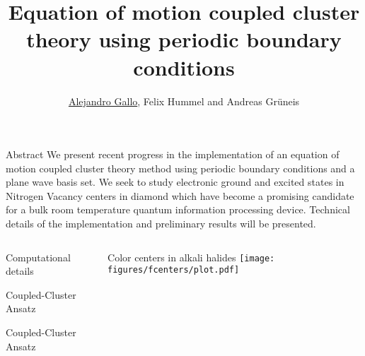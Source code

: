 \documentclass[final]{beamer}
\title{
  Equation of motion coupled cluster theory using periodic boundary conditions
}
\author{\underline{Alejandro Gallo}, Felix Hummel and Andreas Gr\"uneis}
\institute[]{
  Technical University of Vienna
}
\begin{document}
\nocite{*}
\begin{frame}[fragile]{}

  \begin{block}{\large Abstract}
    We present recent progress in the implementation of an equation of motion
    coupled cluster theory method using periodic boundary conditions and a plane
    wave basis set.  We seek to study electronic ground and excited states in
    Nitrogen Vacancy centers in diamond which have become a promising candidate
    for a bulk room temperature quantum information processing device. Technical
    details of the implementation and preliminary results will be presented.
  \end{block}
  \begin{columns}[t]
    \begin{column}{.49\linewidth}
      \begin{block}{\large Computational details}
        
      \end{block}
      \begin{block}{\large Coupled-Cluster Ansatz}
        
      \end{block}
      \begin{block}{\large Coupled-Cluster Ansatz}
        
      \end{block}
    \end{column}


    \begin{column}{.49\linewidth}

      \begin{block}{\large Color centers in alkali halides}
        \texttt{[image: figures/fcenters/plot.pdf]}
      \end{block}


\end{column}
\end{columns}
\end{frame}
\end{document}

